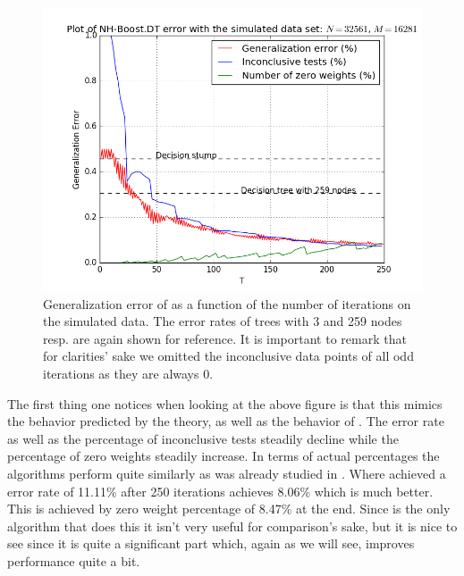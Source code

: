 \begin{figure}[!ht]
  \centering
      \includegraphics[width=\graphWidth]{generated/NHGD.png}
  \caption{Generalization error of \NHB as a function of the number of iterations on the simulated data. The error rates of trees with 3 and 259 nodes resp. are again shown for reference. It is important to remark that for clarities' sake we omitted the inconclusive data points of all odd iterations as they are always 0.}
      \label{fig:NHBGD}
\end{figure}
 \FloatBarrier
 \par The first thing one notices when looking at the above figure is that this mimics the behavior predicted by the theory, as well as the behavior of \adaB. The error rate as well as the percentage of inconclusive tests steadily decline while the percentage of zero weights steadily increase. In terms of actual percentages the algorithms perform quite similarly as was already studied in \cite{Luo2014}. Where \adaB achieved a error rate of 11.11\% after 250 iterations \NHB achieves 8.06\% which is much better. This is achieved by zero weight percentage of 8.47\% at the end. Since \NHB is the only algorithm that does this it isn't very useful for comparison's sake, but it is nice to see since it is quite a significant part which, again as we will see, improves performance quite a bit.  
